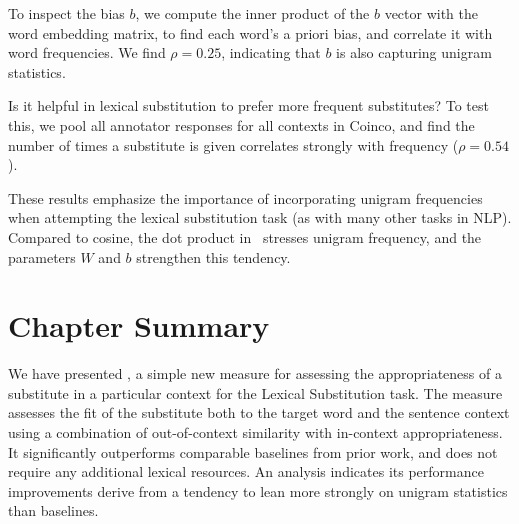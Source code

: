 To inspect the bias $b$, we compute the inner product of the $b$ vector with
the word embedding matrix, to find each word's a priori bias, and correlate it
with word frequencies. We find $\rho=0.25$, indicating that $b$ is also
capturing unigram statistics.

Is it helpful in lexical substitution to prefer more frequent substitutes? To
test this, we pool all annotator responses for all contexts in Coinco, and find
the number of times a substitute is given correlates strongly with frequency
($\rho=0.54$).

These results emphasize the importance of incorporating unigram frequencies
when attempting the lexical substitution task (as with many other tasks in
NLP). Compared to cosine, the dot product in \ourmeas~stresses unigram
frequency, and the parameters $W$ and $b$ strengthen this tendency.

\section{Chapter Summary}

We have presented \ourmeasparam, a simple new measure for assessing the
appropriateness of a substitute in a particular context for the Lexical
Substitution task. The measure assesses the fit of the substitute both to the
target word and the sentence context using a combination of out-of-context
similarity with in-context appropriateness. It significantly outperforms
comparable baselines from prior work, and does not require any additional
lexical resources. An analysis indicates its performance improvements derive
from a tendency to lean more strongly on unigram statistics than baselines.


